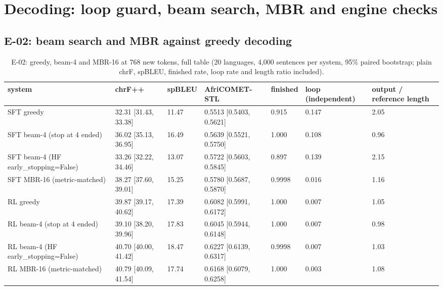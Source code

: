 \section{Decoding: loop guard, beam search, MBR and engine checks}\label{app:decoding}

\subsection*{E-02: beam search and MBR against greedy decoding}

\begin{table}[t]
\centering\scriptsize
\setlength{\tabcolsep}{4pt}
\caption{E-02: greedy, beam-4 and MBR-16 at 768 new tokens, full table (20 languages, 4,000 sentences per system, 95\% paired bootstrap; plain chrF, spBLEU, finished rate, loop rate and length ratio included).}\label{tab:e02_full}
\begin{tabularx}{\linewidth}{@{}>{\raggedright\arraybackslash}Xllllll@{}}
\toprule
system & chrF++ & spBLEU & AfriCOMET-STL & finished & loop (independent) & output / reference length \\
\midrule
SFT greedy & 32.31 [31.43, 33.38] & 11.47 & 0.5513 [0.5403, 0.5621] & 0.915 & 0.147 & 2.05 \\
SFT beam-4 (stop at 4 ended) & 36.02 [35.13, 36.95] & 16.49 & 0.5639 [0.5521, 0.5750] & 1.000 & 0.108 & 0.96 \\
SFT beam-4 (HF early\_stopping=False) & 33.26 [32.22, 34.46] & 13.07 & 0.5722 [0.5603, 0.5845] & 0.897 & 0.139 & 2.15 \\
SFT MBR-16 (metric-matched) & 38.27 [37.60, 39.01] & 15.25 & 0.5780 [0.5687, 0.5870] & 0.9998 & 0.016 & 1.16 \\
RL greedy & 39.87 [39.17, 40.62] & 17.39 & 0.6082 [0.5991, 0.6172] & 1.000 & 0.007 & 1.05 \\
RL beam-4 (stop at 4 ended) & 39.10 [38.20, 39.96] & 17.83 & 0.6045 [0.5944, 0.6148] & 1.000 & 0.007 & 0.98 \\
RL beam-4 (HF early\_stopping=False) & 40.70 [40.00, 41.42] & 18.47 & 0.6227 [0.6139, 0.6317] & 0.9998 & 0.007 & 1.03 \\
RL MBR-16 (metric-matched) & 40.79 [40.09, 41.54] & 17.74 & 0.6168 [0.6079, 0.6258] & 1.000 & 0.003 & 1.08 \\
\bottomrule
\end{tabularx}
\end{table}





